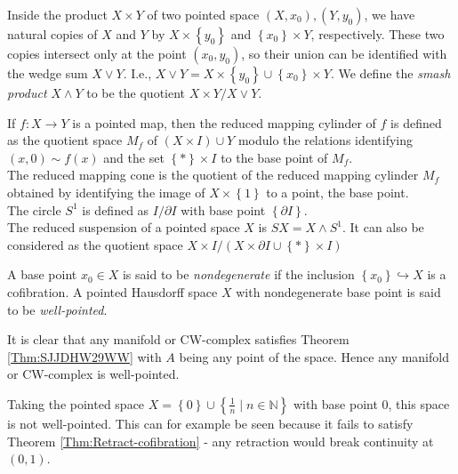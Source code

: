 \begin{definition}
    Inside the product $X \times Y$
    of two pointed space $(X,x_0), (Y,y_0)$,
    we have natural copies of $X$ and $Y$ by
    $X \times \left\{ y_0 \right\} $ and
    $\left\{ x_0 \right\} \times Y$, respectively.
    These two copies intersect only at the point
    $\left( x_0,y_0 \right) $, so their union can
    be identified with
    the wedge sum $X \vee Y$. I.e., $X \vee Y = 
    X \times \left\{ y_0 \right\} \cup 
    \left\{ x_0 \right\} \times Y$. We define
    the \textit{smash product} $X \wedge Y$ to be
    the quotient $X \times Y / X \vee Y$.
\end{definition}


If $f \colon X \to Y$ is a pointed map, then
the reduced mapping cylinder of $f$ is defined
as the quotient space $M_f$ of
$\left( X \times I \right) \cup  Y$ modulo the relations
identifying
$\left( x,0 \right) \sim f(x)$ and the set
$\left\{ * \right\} \times I$ to the base point of $M_f$.\\
The reduced mapping cone is the quotient of the reduced
mapping cylinder $M_f$ obtained by identifying the image of
$X \times \left\{ 1 \right\} $ to a point, the
base point.\\

The circle $S^{1}$ is defined as
$I / \partial I$ with base point $\left\{ \partial I \right\} $.\\
The reduced suspension of a pointed space $X$ is
$SX = X \wedge S^{1}$. It can also be considered
as the quotient space $X \times I / \left( X \times 
\partial I \cup  \left\{ * \right\} \times I\right) $


\begin{definition}
    A base point $x_0 \in X$ is said to be
    \textit{nondegenerate} if the inclusion
    $\left\{ x_0 \right\} \hookrightarrow X$ is a cofibration.
    A pointed Hausdorff space $X$ with nondegenerate
    base point is said to be \textit{well-pointed}.
\end{definition}

It is clear that any manifold or CW-complex satisfies
Theorem \ref{Thm:SJJDHW29WW} with $A$ being any point of
the space. Hence any manifold or CW-complex is
well-pointed.\\

\begin{example}
    Taking the pointed space  $X = 
    \left\{ 0 \right\} \cup  \left\{ \frac{1}{n} \mid 
    n \in \mathbb{N} \right\} $ with base point $0$, this
    space is not well-pointed. This can for example be
    seen because it fails to satisfy Theorem
    \ref{Thm:Retract-cofibration} - any retraction
    would break continuity at
    $\left( 0,1 \right) $.
\end{example}

